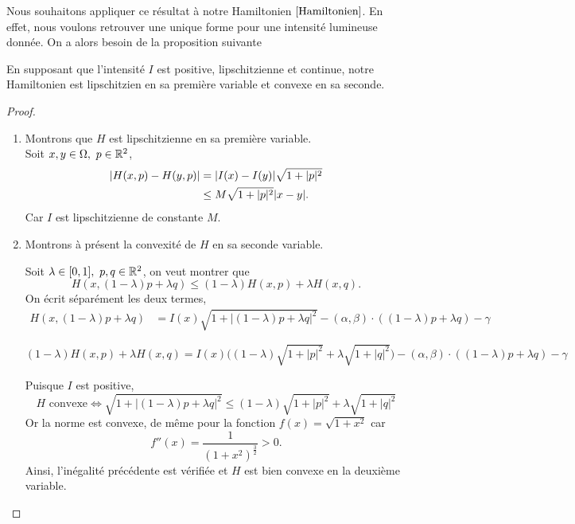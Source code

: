 Nous souhaitons appliquer ce résultat à notre Hamiltonien $\eqref{Hamiltonien}$. En effet, nous voulons retrouver une unique forme pour une intensité lumineuse donnée. On a alors besoin de la proposition suivante

\begin{proposition}
    En supposant que l'intensité $I$ est positive, lipschitzienne et continue, notre Hamiltonien est lipschitzien en sa première variable et convexe en sa seconde.
\end{proposition}
    
\begin{proof}

    \begin{enumerate}
        \item Montrons que $H$ est lipschitzienne en sa première variable. \\
        Soit $x,y\in\Omega, \ p\in \mathbb{R}^2$,
        \begin{align*}
            |H(x,p)-H(y,p)|&=|I(x)-I(y)|\sqrt{1+|p|^2}\\
            &\le M\sqrt{1+\mathopen{}\left|p\right|\mathclose{}^2}|x-y|.
        \end{align*}
        Car $I$ est lipschitzienne de constante $M$.
    
        \item Montrons à présent la convexité de $H$ en sa seconde variable. 
        
        Soit $\lambda \in \mathopen{}\left[0,1\right]\mathclose{}, \ p,q\in \mathbb{R}^2$, on veut montrer que 
        \[
            H(x,(1-\lambda) p+\lambda q ) \leq (1-\lambda) H(x,p)+\lambda H(x,q).
        \]
        On écrit séparément les deux termes,
        \begin{align*}
            H(x, (1-\lambda)p + \lambda q) &= I(x) \sqrt{1 + |(1-\lambda)p + \lambda q|^2}- (\alpha, \beta) \cdot ((1-\lambda)p + \lambda q) - \gamma
        \end{align*}
        
        \hspace*{-1.5cm}%
        $\displaystyle (1-\lambda)H(x,p) + \lambda H(x,q) = I(x)\big((1-\lambda)\sqrt{1 + |p|^2} + \lambda \sqrt{1 + |q|^2}\big) - (\alpha, \beta) \cdot ((1-\lambda)p + \lambda q) - \gamma$

        \medskip

        Puisque $I$ est positive, 
        \begin{equation*}
            H \text{ convexe} \Longleftrightarrow \sqrt{1+|(1-\lambda)p+\lambda q|^2}\le (1-\lambda)\sqrt{1+|p|^2}+\lambda \sqrt{1+|q|^2}
        \end{equation*}
        Or la norme est convexe, de même pour la fonction $f(x)=\sqrt{1+x^2}$ car 
        \begin{equation*}
             f''(x)=\dfrac{1}{{(1+x^2)}^{\frac{3}{2}}}>0.
        \end{equation*}
        Ainsi, l'inégalité précédente est vérifiée et $H$ est bien convexe en la deuxième variable.
    \end{enumerate}\qedhere
\end{proof}


